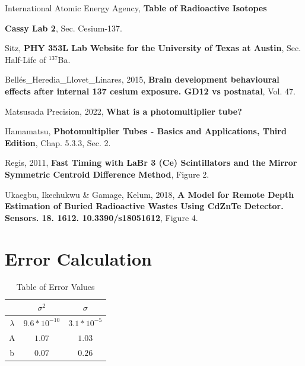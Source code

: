 \documentclass[10pt,letterpaper,onecolumn]{article}
\begin{document}
\pagebreak

\begin{thebibliography}{9}

International Atomic Energy Agency, {\bf Table of Radioactive Isotopes}

{\bf Cassy Lab 2}, Sec. Cesium-137.

Sitz, {\bf PHY 353L Lab Website for the University of Texas at Austin}, Sec. Half-Life of $^{137}$Ba.

Bellés\_Heredia\_Llovet\_Linares, 2015, {\bf Brain development behavioural effects after internal 137 cesium exposure. GD12 vs postnatal}, Vol. 47.

Matsusada Precision, 2022, {\bf What is a photomultiplier tube?}

Hamamatsu, {\bf Photomultiplier Tubes - Basics and Applications, Third Edition}, Chap. 5.3.3, Sec. 2.

Regis, 2011, {\bf Fast Timing with LaBr 3 (Ce) Scintillators and the Mirror Symmetric Centroid Difference Method}, Figure 2.

Ukaegbu, Ikechukwu \& Gamage, Kelum, 2018, {\bf A Model for Remote Depth Estimation of Buried Radioactive Wastes Using CdZnTe Detector. Sensors. 18. 1612. 10.3390/s18051612}, Figure 4.


\end{thebibliography}

\appendixpage
\section{Error Calculation}
\begin{table}[h]

{
{%
\begin {center}
\begin {tabular} {c | c | c }
\hline\hline
 & $\sigma^{2}$ & $\sigma$ \\
\hline
$\lambda$ &	$9.6*10^{-10}$ & $3.1*10^{-5}$\\
\hline
A	& $1.07$ & $1.03$ \\
\hline
b & $0.07$ & $0.26$ \\
\hline
\end {tabular}
\end {center}
}
}
\caption {\label{tab:events}
Table of Error Values
 }

\end{table}
\end{document}
